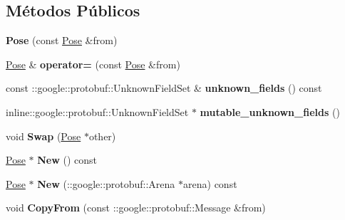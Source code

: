 \subsection*{Métodos Públicos}
\begin{DoxyCompactItemize}
\item 
{\bfseries Pose} (const \hyperlink{classvss__state_1_1Pose}{Pose} \&from)\hypertarget{classvss__state_1_1Pose_afbd08781a545cc0d5b06623f929e80c7}{}\label{classvss__state_1_1Pose_afbd08781a545cc0d5b06623f929e80c7}

\item 
\hyperlink{classvss__state_1_1Pose}{Pose} \& {\bfseries operator=} (const \hyperlink{classvss__state_1_1Pose}{Pose} \&from)\hypertarget{classvss__state_1_1Pose_af5acd047e2b69e6fbb54592bbf599bfc}{}\label{classvss__state_1_1Pose_af5acd047e2b69e6fbb54592bbf599bfc}

\item 
const \+::google\+::protobuf\+::\+Unknown\+Field\+Set \& {\bfseries unknown\+\_\+fields} () const \hypertarget{classvss__state_1_1Pose_a6c3b4c8e189c186061297043d00b68bb}{}\label{classvss__state_1_1Pose_a6c3b4c8e189c186061297043d00b68bb}

\item 
inline\+::google\+::protobuf\+::\+Unknown\+Field\+Set $\ast$ {\bfseries mutable\+\_\+unknown\+\_\+fields} ()\hypertarget{classvss__state_1_1Pose_a76aee4c2024d80ffe335e65907434dee}{}\label{classvss__state_1_1Pose_a76aee4c2024d80ffe335e65907434dee}

\item 
void {\bfseries Swap} (\hyperlink{classvss__state_1_1Pose}{Pose} $\ast$other)\hypertarget{classvss__state_1_1Pose_a6288b4add8dde23e78f2dd0a54ddc00a}{}\label{classvss__state_1_1Pose_a6288b4add8dde23e78f2dd0a54ddc00a}

\item 
\hyperlink{classvss__state_1_1Pose}{Pose} $\ast$ {\bfseries New} () const \hypertarget{classvss__state_1_1Pose_ac5df28dce77b8c3566505950585528c3}{}\label{classvss__state_1_1Pose_ac5df28dce77b8c3566505950585528c3}

\item 
\hyperlink{classvss__state_1_1Pose}{Pose} $\ast$ {\bfseries New} (\+::google\+::protobuf\+::\+Arena $\ast$arena) const \hypertarget{classvss__state_1_1Pose_aa47e4b4bbbce2532645868c51c4ee96b}{}\label{classvss__state_1_1Pose_aa47e4b4bbbce2532645868c51c4ee96b}

\item 
void {\bfseries Copy\+From} (const \+::google\+::protobuf\+::\+Message \&from)\hypertarget{classvss__state_1_1Pose_a6e17322c8f9d53e131ed8e1702aefcd3}{}\label{classvss__state_1_1Pose_a6e17322c8f9d53e131ed8e1702aefcd3}


\end{DoxyCompactItemize}
